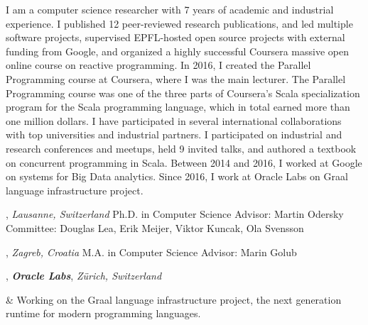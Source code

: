 \documentclass[9pt]{article}
\begin{document}
\noindent
I am a computer science researcher with 7 years of academic
and industrial experience.
I published 12 peer-reviewed research publications,
and led multiple software projects,
supervised EPFL-hosted open source projects with external funding from Google,
and organized a highly successful Coursera massive open online course
on reactive programming.
In 2016, I created the Parallel Programming course at Coursera,
where I was the main lecturer.
The Parallel Programming course was one of the three parts
of Coursera's Scala specialization program for the Scala programming language,
which in total earned more than one million dollars.
I have participated in several international collaborations
with top universities and industrial partners.
I participated on industrial and research conferences and meetups,
held 9 invited talks,
and authored a textbook on concurrent programming in Scala.
Between 2014 and 2016, I worked at Google on systems for Big Data analytics.
Since 2016, I work at Oracle Labs on Graal language infrastructure project.
\newline



,
\emph{Lausanne, Switzerland} \vspace{0.01in} 
\newline Ph.D. in Computer Science
\newline Advisor: Martin Odersky
\newline Committee: Douglas Lea, Erik Meijer, Viktor Kuncak, Ola Svensson
\bigskip

,
\emph{Zagreb, Croatia} \vspace{0.01in}
\newline M.A. in Computer Science
\newline Advisor: Marin Golub
\bigskip

\medskip
{}

, {\bf \em Oracle Labs}, \emph{Zürich, Switzerland}
\vspace{0.01in} 
\newline\noindent 
\begin{easylist}[itemize]
& Working on the Graal language infrastructure project, the next generation runtime for
  modern programming languages.
\end{easylist}
\bigskip
\end{document}
